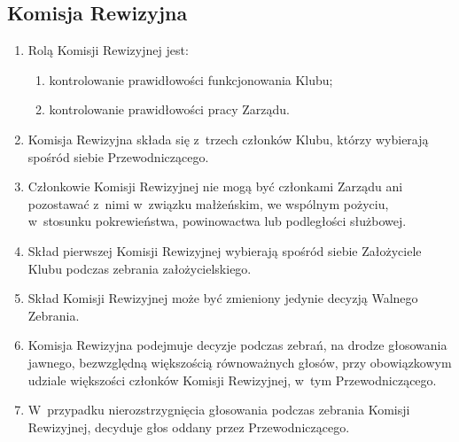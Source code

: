 \subsection{Komisja Rewizyjna}
\begin{enumerate}
    \item Rolą Komisji Rewizyjnej jest:
    \begin{enumerate}
        \item kontrolowanie prawidłowości funkcjonowania Klubu;
        \item kontrolowanie prawidłowości pracy Zarządu.
    \end{enumerate}
    \item Komisja Rewizyjna składa się z~trzech członków Klubu, którzy wybierają spośród siebie Przewodniczącego.
    \item Członkowie Komisji Rewizyjnej nie mogą być członkami Zarządu ani pozostawać z~nimi w~związku małżeńskim, we wspólnym pożyciu, w~stosunku pokrewieństwa, powinowactwa lub podległości służbowej.
    \item Skład pierwszej Komisji Rewizyjnej wybierają spośród siebie Założyciele Klubu podczas zebrania założycielskiego.
    \item Skład Komisji Rewizyjnej może być zmieniony jedynie decyzją Walnego Zebrania.
    \item Komisja Rewizyjna podejmuje decyzje podczas zebrań, na drodze głosowania jawnego, bezwzględną większością równoważnych głosów, przy obowiązkowym udziale większości członków Komisji Rewizyjnej, w~tym Przewodniczącego.
    \item W~przypadku nierozstrzygnięcia głosowania podczas zebrania Komisji Rewizyjnej, decyduje głos oddany przez Przewodniczącego.
\end{enumerate}